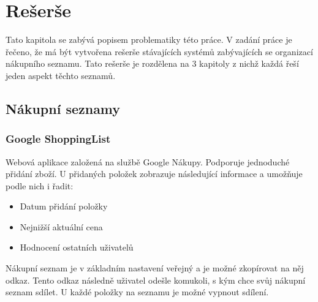
\chapter{Rešerše}
Tato kapitola se zabývá popisem problematiky této práce. V zadání práce je řečeno, že má být vytvořena rešerše stávajících systémů zabývajících se organizací nákupního seznamu. Tato rešerše je rozdělena na 3 kapitoly z nichž každá řeší jeden aspekt těchto seznamů.

\section{Nákupní seznamy}

\subsection{Google ShoppingList}
Webová aplikace založená na službě Google Nákupy. Podporuje jednoduché přidání zboží. U přidaných položek zobrazuje následující informace a umožňuje podle nich i řadit:
\begin{itemize}
\item Datum přidání položky
\item Nejnižší aktuální cena
\item Hodnocení ostatních uživatelů
\end{itemize}
Nákupní seznam je v základním nastavení veřejný a je možné zkopírovat na něj odkaz. Tento odkaz následně uživatel odešle komukoli, s kým chce svůj nákupní seznam sdílet. U každé položky na seznamu je možné vypnout sdílení.

